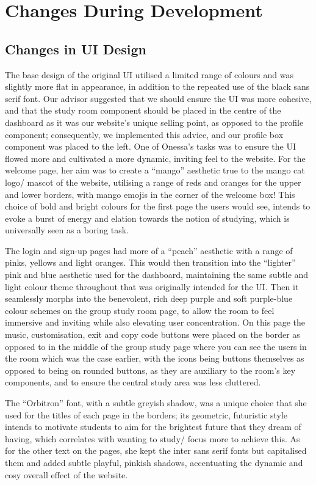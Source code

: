 \section{Changes During Development}
\label{sect:changes-during-development}

\subsection{Changes in UI Design}
The base design of the original UI utilised a limited range of colours and was slightly more flat in appearance, in addition to the repeated use of the black sans serif font. Our advisor suggested that we should ensure the UI was more cohesive, and that the study room component should be placed in the centre of the dashboard as it was our website’s unique selling point, as opposed to the profile component; consequently, we implemented this advice, and our profile box component was placed to the left.
One of Onessa’s tasks was to ensure the UI flowed more and cultivated a more dynamic, inviting feel to the website. For the welcome page, her aim was to create a “mango” aesthetic true to the mango cat logo/ mascot of the website, utilising a range of reds and oranges for the upper and lower borders, with  mango emojis in the corner of the welcome box! This choice of bold and bright colours for the first page the users would see, intends to evoke a burst of energy and elation towards the notion of studying, which is universally seen as a boring task.

The login and sign-up pages had more of a “peach” aesthetic with a range of pinks, yellows and light oranges. This would then transition into the “lighter” pink and blue aesthetic used for the dashboard, maintaining the same subtle and light colour theme throughout that was originally intended for the UI. Then it seamlessly morphs into the benevolent, rich deep purple and soft purple-blue colour schemes on the group study room page, to allow the room to feel immersive and inviting while also elevating user concentration. On this page the music, customisation, exit and copy code buttons were placed on the border as opposed to in the middle of the group study page where you can see the users in the room which was the case earlier, with the icons being buttons themselves as opposed to being on rounded buttons, as they are auxiliary to the room’s key components, and to ensure the central study area was less cluttered.

The “Orbitron” font, with a subtle greyish shadow, was a unique choice that she used for the titles of each page in the borders; its geometric, futuristic style intends to motivate students to aim for the brightest future that they dream of having, which correlates with wanting to study/ focus more to achieve this. As for the other text on the pages, she kept the inter sans serif fonts but capitalised them and added subtle playful, pinkish shadows, accentuating the dynamic and cosy overall effect of the website.

